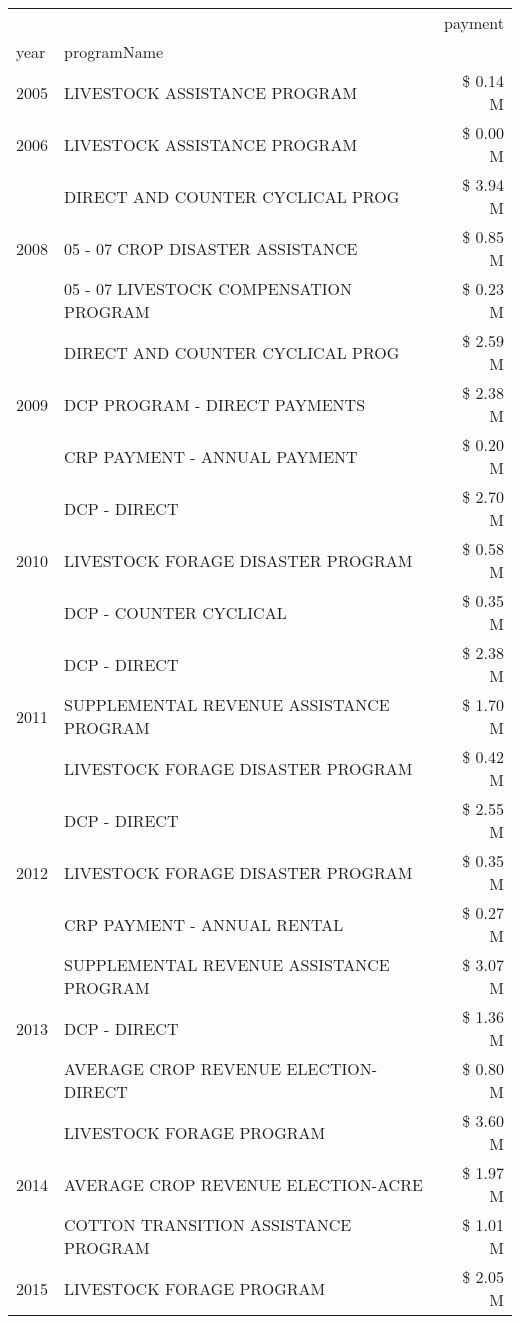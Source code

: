 \begin{tabular}{llr}
\toprule
 &  & payment \\
year & programName &  \\
\midrule
2005 & LIVESTOCK ASSISTANCE PROGRAM & \$ 0.14 M \\
\cline{1-3}
2006 & LIVESTOCK ASSISTANCE PROGRAM & \$ 0.00 M \\
\cline{1-3}
\multirow[t]{3}{*}{2008} & DIRECT AND COUNTER CYCLICAL PROG & \$ 3.94 M \\
 & 05 - 07 CROP DISASTER ASSISTANCE & \$ 0.85 M \\
 & 05 - 07 LIVESTOCK COMPENSATION PROGRAM & \$ 0.23 M \\
\cline{1-3}
\multirow[t]{3}{*}{2009} & DIRECT AND COUNTER CYCLICAL PROG & \$ 2.59 M \\
 & DCP PROGRAM - DIRECT PAYMENTS & \$ 2.38 M \\
 & CRP PAYMENT - ANNUAL PAYMENT & \$ 0.20 M \\
\cline{1-3}
\multirow[t]{3}{*}{2010} & DCP - DIRECT & \$ 2.70 M \\
 & LIVESTOCK FORAGE DISASTER PROGRAM & \$ 0.58 M \\
 & DCP - COUNTER CYCLICAL & \$ 0.35 M \\
\cline{1-3}
\multirow[t]{3}{*}{2011} & DCP - DIRECT & \$ 2.38 M \\
 & SUPPLEMENTAL REVENUE ASSISTANCE PROGRAM & \$ 1.70 M \\
 & LIVESTOCK FORAGE DISASTER PROGRAM & \$ 0.42 M \\
\cline{1-3}
\multirow[t]{3}{*}{2012} & DCP - DIRECT & \$ 2.55 M \\
 & LIVESTOCK FORAGE DISASTER PROGRAM & \$ 0.35 M \\
 & CRP PAYMENT - ANNUAL RENTAL & \$ 0.27 M \\
\cline{1-3}
\multirow[t]{3}{*}{2013} & SUPPLEMENTAL REVENUE ASSISTANCE PROGRAM & \$ 3.07 M \\
 & DCP - DIRECT & \$ 1.36 M \\
 & AVERAGE CROP REVENUE ELECTION-DIRECT & \$ 0.80 M \\
\cline{1-3}
\multirow[t]{3}{*}{2014} & LIVESTOCK FORAGE PROGRAM & \$ 3.60 M \\
 & AVERAGE CROP REVENUE ELECTION-ACRE & \$ 1.97 M \\
 & COTTON TRANSITION ASSISTANCE PROGRAM & \$ 1.01 M \\
\cline{1-3}
\multirow[t]{3}{*}{2015} & LIVESTOCK FORAGE PROGRAM & \$ 2.05 M \\

\end{tabular}
